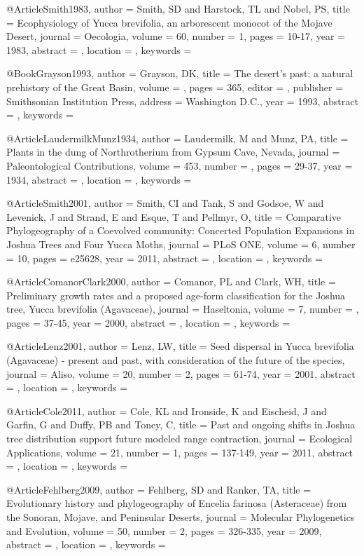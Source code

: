 @Article{Smith1983,
author = {Smith, SD and Harstock, TL and Nobel, PS}, 
title = {Ecophysiology of Yucca brevifolia, an arborescent monocot of the Mojave Desert}, 
journal = {Oecologia}, 
volume = {60}, 
number = {1}, 
pages = {10-17}, 
year = {1983}, 
abstract = {}, 
location = {}, 
keywords = {}}


@Book{Grayson1993,
author = {Grayson, DK}, 
title = {The desert's past: a natural prehistory of the Great Basin}, 
volume = {}, 
pages = {365}, 
editor = {}, 
publisher = {Smithsonian Institution Press}, 
address = {Washington D.C.}, 
year = {1993}, 
abstract = {}, 
keywords = {}}

@Article{LaudermilkMunz1934,
author = {Laudermilk, M and Munz, PA}, 
title = {Plants in the dung of Northrotherium from Gypsum Cave, Nevada}, 
journal = {Paleontological Contributions}, 
volume = {453}, 
number = {}, 
pages = {29-37}, 
year = {1934}, 
abstract = {}, 
location = {}, 
keywords = {}}


@Article{Smith2001,
author = {Smith, CI and Tank, S and Godsoe, W and Levenick, J and Strand, E and Esque, T and Pellmyr, O}, 
title = {Comparative Phylogeography of a Coevolved community: Concerted Population Expansions in Joshua Trees and Four Yucca Moths}, 
journal = {PLoS ONE}, 
volume = {6}, 
number = {10}, 
pages = {e25628}, 
year = {2011}, 
abstract = {}, 
location = {}, 
keywords = {}}


@Article{ComanorClark2000,
author = {Comanor, PL and Clark, WH}, 
title = {Preliminary growth rates and a proposed age-form classification for the Joshua tree, Yucca brevifolia (Agavaceae)}, 
journal = {Haseltonia}, 
volume = {7}, 
number = {}, 
pages = {37-45}, 
year = {2000}, 
abstract = {}, 
location = {}, 
keywords = {}}


@Article{Lenz2001,
author = {Lenz, LW}, 
title = {Seed dispersal in Yucca brevifolia (Agavaceae) - present and past, with consideration of the future of the species}, 
journal = {Aliso}, 
volume = {20}, 
number = {2}, 
pages = {61-74}, 
year = {2001}, 
abstract = {}, 
location = {}, 
keywords = {}}


@Article{Cole2011,
author = {Cole, KL and Ironside, K and Eischeid, J and Garfin, G and Duffy, PB and Toney, C}, 
title = {Past and ongoing shifts in Joshua tree distribution support future modeled range contraction}, 
journal = {Ecological Applications}, 
volume = {21}, 
number = {1}, 
pages = {137-149}, 
year = {2011}, 
abstract = {}, 
location = {}, 
keywords = {}}


@Article{Fehlberg2009,
author = {Fehlberg, SD and Ranker, TA}, 
title = {Evolutionary history and phylogeography of Encelia farinosa (Asteraceae) from the Sonoran, Mojave, and Peninsular Deserts}, 
journal = {Molecular Phylogenetics and Evolution}, 
volume = {50}, 
number = {2}, 
pages = {326-335}, 
year = {2009}, 
abstract = {}, 
location = {}, 
keywords = {}}


